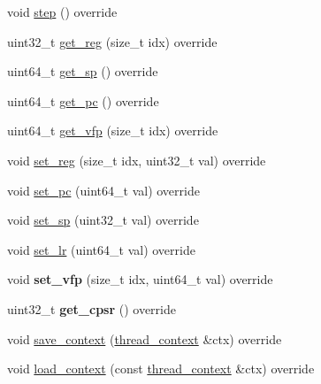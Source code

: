 \begin{DoxyCompactItemize}
\item 
void \mbox{\hyperlink{classeka2l1_1_1arm_1_1jit__unicorn_a48ef5b1901b82dae466c340785997c92}{step}} () override
\item 
uint32\+\_\+t \mbox{\hyperlink{classeka2l1_1_1arm_1_1jit__unicorn_a94a0495c63ad80defc3afd71b7a89d04}{get\+\_\+reg}} (size\+\_\+t idx) override
\item 
uint64\+\_\+t \mbox{\hyperlink{classeka2l1_1_1arm_1_1jit__unicorn_a2ce8f21025bc1d4a6cf0e404cef6f3ab}{get\+\_\+sp}} () override
\item 
uint64\+\_\+t \mbox{\hyperlink{classeka2l1_1_1arm_1_1jit__unicorn_a8429f8e0e5aafa264929336aaafc2e24}{get\+\_\+pc}} () override
\item 
uint64\+\_\+t \mbox{\hyperlink{classeka2l1_1_1arm_1_1jit__unicorn_ad286a92b696c835962dc8f40b292e4fb}{get\+\_\+vfp}} (size\+\_\+t idx) override
\item 
void \mbox{\hyperlink{classeka2l1_1_1arm_1_1jit__unicorn_ab56d9aa1489ec8d7a0c383f7d4048f03}{set\+\_\+reg}} (size\+\_\+t idx, uint32\+\_\+t val) override
\item 
void \mbox{\hyperlink{classeka2l1_1_1arm_1_1jit__unicorn_ae5ea9a9c15af2aa73384e845679e1b7a}{set\+\_\+pc}} (uint64\+\_\+t val) override
\item 
void \mbox{\hyperlink{classeka2l1_1_1arm_1_1jit__unicorn_a57b9a59b3deb69a66b85394280f15947}{set\+\_\+sp}} (uint32\+\_\+t val) override
\item 
void \mbox{\hyperlink{classeka2l1_1_1arm_1_1jit__unicorn_a73a5362b1004f6c7bcaa4f2580fefb2c}{set\+\_\+lr}} (uint64\+\_\+t val) override
\item 
\mbox{\label{classeka2l1_1_1arm_1_1jit__unicorn_a3cb6262c305d2716c772fe71e9e84691}} 
void {\bfseries set\+\_\+vfp} (size\+\_\+t idx, uint64\+\_\+t val) override
\item 
\mbox{\label{classeka2l1_1_1arm_1_1jit__unicorn_a16ce2310695fe56db466d6c78bcf3f8b}} 
uint32\+\_\+t {\bfseries get\+\_\+cpsr} () override
\item 
void \mbox{\hyperlink{classeka2l1_1_1arm_1_1jit__unicorn_a315e75d56daf439ca9914fcf44de5dcf}{save\+\_\+context}} (\mbox{\hyperlink{structeka2l1_1_1arm_1_1jit__interface_1_1thread__context}{thread\+\_\+context}} \&ctx) override
\item 
void \mbox{\hyperlink{classeka2l1_1_1arm_1_1jit__unicorn_a54d69d4246e4c22e06b3d4b2b43d9872}{load\+\_\+context}} (const \mbox{\hyperlink{structeka2l1_1_1arm_1_1jit__interface_1_1thread__context}{thread\+\_\+context}} \&ctx) override

\end{DoxyCompactItemize}

